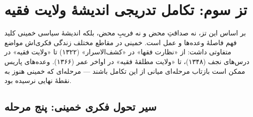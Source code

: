 \chapter{تز سوم: تکامل تدریجی اندیشهٔ ولایت فقیه}

\begin{infoBox}
بر اساس این تز، نه صداقتِ محض و نه فریبِ محض، بلکه  اندیشهٔ سیاسی خمینی کلید فهم فاصلهٔ وعده‌ها و عمل است. خمینی در مقاطع مختلف زندگی فکری‌اش مواضع متفاوتی داشت: از «نظارت فقها» در «کشف‌الاسرار» (۱۳۲۲) تا «ولایت فقیه» در درس‌های نجف (۱۳۴۸)، تا «ولایت مطلقهٔ فقیه» در اواخر عمر (۱۳۶۶). وعده‌های پاریس ممکن است بازتاب مرحله‌ای میانی از این تکامل باشند — مرحله‌ای که خمینی هنوز به نقطهٔ نهایی نرسیده بود.
\end{infoBox}

\section{سیر تحول فکری خمینی: پنج مرحله}


